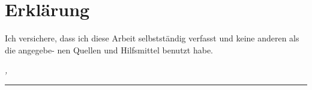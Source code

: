 %
\chapter*{Erklärung}
\label{sec:declaration}
\thispagestyle{empty}

Ich versichere, dass ich diese Arbeit selbstständig verfasst und keine anderen als die angegebe-
nen Quellen und Hilfsmittel benutzt habe.
\bigskip

\noindent\textit{\thesisUniversityCity, \thesisDate}

\smallskip

\begin{flushright}
	\begin{minipage}{5cm}
		\rule{\textwidth}{1pt}
		\centering\thesisName
	\end{minipage}
\end{flushright}

